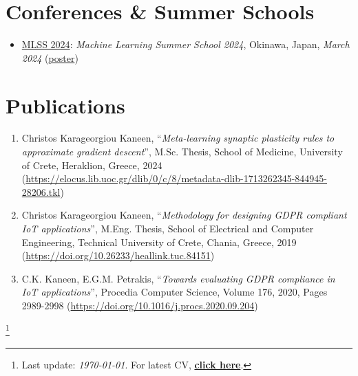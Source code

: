 \documentclass[letterpaper,11pt]{article}
\newcommand\blfootnote[1]{%
  \begingroup
  \renewcommand\thefootnote{}\footnote{#1}%
  \addtocounter{footnote}{-1}%
  \endgroup
}
\begin{document}
\section{Conferences \& Summer Schools}
  \begin{itemize}
    \item {{}} {} \href{https://groups.oist.jp/mlss}{MLSS 2024}: \textit{Machine Learning Summer School 2024}, Okinawa, Japan, \textit{March 2024} (\href{https://raw.githubusercontent.com/ckarageorgkaneen/mlss2024/main/poster.pdf}{poster})
  \end{itemize}

\section{Publications}
\begin{enumerate}
\item Christos Karageorgiou Kaneen, ``\textit{Meta-learning synaptic plasticity rules to approximate gradient descent}'', M.Sc. Thesis, School of Medicine, University of Crete, Heraklion, Greece, 2024 (\url{https://elocus.lib.uoc.gr/dlib/0/c/8/metadata-dlib-1713262345-844945-28206.tkl})
\item Christos Karageorgiou Kaneen, ``\textit{Methodology for designing GDPR compliant IoT applications}'', M.Eng. Thesis, School of Electrical and Computer Engineering, Technical University of Crete, Chania, Greece, 2019 (\url{https://doi.org/10.26233/heallink.tuc.84151})
\item C.K. Kaneen, E.G.M. Petrakis, ``\textit{Towards evaluating GDPR compliance in IoT applications}'', Procedia Computer Science, Volume 176, 2020, Pages 2989-2998 (\url{https://doi.org/10.1016/j.procs.2020.09.204})
\end{enumerate}

\blfootnote{\large{Last update: \textit{\today}. For latest CV, \href{https://raw.githubusercontent.com/ckarageorgkaneen/cv/master/cv.pdf}{\textbf{click here}}.}}
\end{document}
